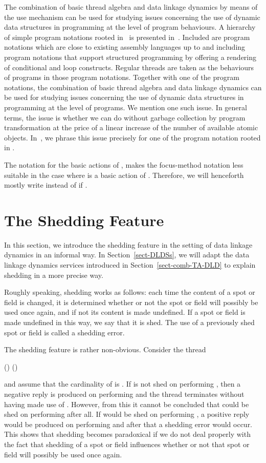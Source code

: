 \documentclass[fleqn]{llncs}
\begin{document}
The combination of basic thread algebra and data linkage dynamics by
means of the use mechanism can be used for studying issues concerning
the use of dynamic data structures in programming at the level of
program behaviours.
A hierarchy of simple program notations rooted in \PGA\ is presented
in~\cite{BL02a}.
Included are program notations which are close to existing assembly
languages up to and including program notations that support structured
programming by offering a rendering of conditional and loop constructs.
Regular threads are taken as the behaviours of programs in those program
notations.
Together with one of the program notations, the combination of basic
thread algebra and data linkage dynamics can be used for studying issues
concerning the use of dynamic data structures in programming at the
level of programs.
We mention one such issue.
In general terms, the issue is whether we can do without garbage
collection by program transformation at the price of a linear increase
of the number of available atomic objects.
In~\cite{BM08d}, we phrase this issue precisely for one of the program
notation rooted in \PGA.

The notation for the basic actions of \DLD, makes the focus-method
notation  less suitable in the case where  is a basic action of
\DLD.
Therefore, we will henceforth mostly write  instead of  if
.

\section{The Shedding Feature}
\label{sect-shedding}

In this section, we introduce the shedding feature in the setting of
data linkage dynamics in an informal way.
In Section~\ref{sect-DLDSs}, we will adapt the data linkage dynamics
services introduced in Section~\ref{sect-comb-TA-DLD} to explain
shedding in a more precise way.

Roughly speaking, shedding works as follows: each time the content of a
spot or field is changed, it is determined whether or not the spot or
field will possibly be used once again, and if not its content is made
undefined.
If a spot or field is made undefined in this way, we say that it is
shed.
The use of a previously shed spot or field is called a shedding error.

The shedding feature is rather non-obvious.
Consider the thread
\begin{ldispl}
\dld() \bapf
()
\end{ldispl}and assume that the cardinality of  is .
If  is not shed on performing , then a negative reply
is produced on performing  and the thread terminates
without having made use of .
However, from this it cannot be concluded that  could be shed on
performing  after all.
If  would be shed on performing , a positive reply
would be produced on performing  and after that a shedding
error would occur.
This shows that shedding becomes paradoxical if we do not deal properly
with the fact that shedding of a spot or field influences whether or not
that spot or field will possibly be used once again.
\end{document}
